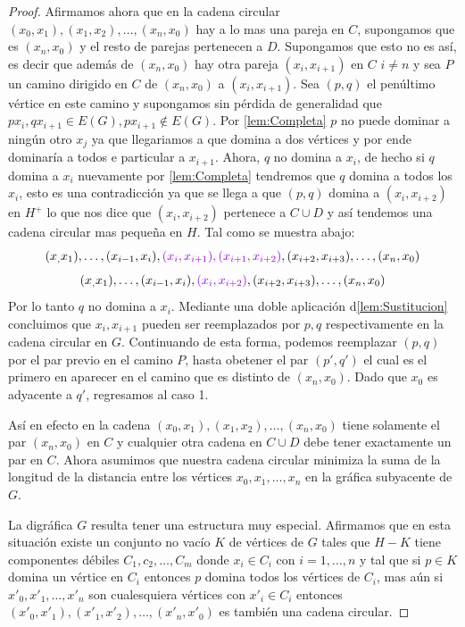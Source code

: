 \begin{proof}
Afirmamos ahora que en la cadena circular $(x_0,x_1),(x_1,x_2),\dots , (x_n,x_0)$ hay a lo mas una pareja en $C$, supongamos que es $(x_n,x_0)$ y el resto de parejas pertenecen a $D$. Supongamos que esto no es así, es decir que adem\'as de $(x_n,x_0)$ hay otra pareja $(x_i,x_{i+1})$ en $C$ $i\neq n$ y sea $P$ un camino dirigido en $C$ de $(x_n,x_0)$ a $(x_i,x_{i+1})$. Sea $(p,q)$ el penúltimo v\'ertice en este camino y supongamos sin p\'erdida de generalidad que $px_i,qx_{i+1}\in E(G), px_{i+1}\notin E(G)$. Por \cref{lem:Completa} $p$ no puede dominar a ningún otro $x_j$ ya que llegariamos a que domina a dos v\'ertices y por ende dominaría a todos e particular a $x_{i+1}$. Ahora, $q$ no domina a $x_i$, de hecho si $q$ domina a $x_i$ nuevamente por \cref{lem:Completa} tendremos que $q$ domina a todos los $x_i$, esto es una contradicci\'on ya que se llega a que $(p,q)$ domina a $(x_i,x_{i+2})$ en $H^+$ lo que nos dice que $(x_i,x_{i+2})$ pertenece a $C\cup D$ y así tendemos una cadena circular mas pequeña en $H$. Tal como se muestra abajo:
$$ (x_,x_1), \dots , (x_{i-1},x_i ), {\color{malva} (x_i,x_{i+1}), (x_{i+1},x_{i+2})},(x_{i+2},x_{i+3}), \dots , (x_n,x_0) $$
$$ (x_,x_1), \dots , (x_{i-1},x_i ), {\color{malva} (x_i,x_{i+2})},(x_{i+2},x_{i+3}), \dots , (x_n,x_0) $$
Por lo tanto $q$ no domina a $x_i$. Mediante una doble aplicaci\'on d\cref{lem:Sustitucion} concluimos que $x_i,x_{i+1}$ pueden ser reemplazados por $p,q$ respectivamente en la cadena circular en $G$. Continuando de esta forma, podemos reemplazar $(p,q)$ por el par previo en el camino $P$, hasta obetener el par $(p',q')$ el cual es el primero en aparecer en el camino que es distinto de $(x_n,x_0)$. Dado que $x_0$ es adyacente a $q'$, regresamos al caso 1.

Así en efecto en la cadena $(x_0,x_1),(x_1,x_2),\dots,(x_n,x_0)$ tiene solamente el par $(x_n,x_0)$ en $C$ y cualquier otra cadena en $C\cup D$ debe tener exactamente un par en $C$. Ahora asumimos que nuestra cadena circular minimiza la suma de la longitud de la distancia entre los vértices $x_0,x_1,\dots ,x_n$ en la gráfica subyacente de $G$.

La digráfica $G$ resulta tener una estructura muy especial. Afirmamos que en esta situación existe un conjunto no vac\'io $K$ de vértices de $G$ tales que $H-K$ tiene componentes d\'ebiles $C_1,c_2,\dots,C_m$ donde $x_i\in C_i$ con $i=1,\dots,n$ y tal que si $p\in K$ domina un vértice en $C_i$ entonces $p$ domina todos los vértices de $C_i$, mas aún si $x'_0,x'_1,\dots,x'_n$ son cualesquiera vértices con $x'_i\in C_i$ entonces $(x'_0,x'_1),(x'_1,x'_2),\dots,(x'_n,x'_0)$ es también una cadena circular.

\end{proof}